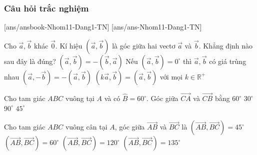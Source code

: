 \subsubsection{Câu hỏi trắc nghiệm}
[ans/ansbook-Nhom11-Dang1-TN]
[ans/ans-Nhom11-Dang1-TN]
\begin{ex}
	Cho $\overrightarrow{a},\overrightarrow{b}$ khác $\overrightarrow{0}$. Kí hiệu $\left (\overrightarrow{a},\overrightarrow{b}\right )$ là góc giữa hai vectơ $\overrightarrow{a}$ và $\overrightarrow{b}$. Khẳng định nào sau đây là đúng?
	\choice
	{$\left (\overrightarrow{a},\overrightarrow{b}\right )=-\left (\overrightarrow{b},\overrightarrow{a}\right )$}
	{Nếu $\left (\overrightarrow{a},\overrightarrow{b}\right )=0^\circ$ thì $\overrightarrow{a},\overrightarrow{b}$ có giá trùng nhau}
	{$\left (\overrightarrow{a},-\overrightarrow{b}\right )=-\left (\overrightarrow{a},\overrightarrow{b}\right )$}
	{\True $\left (k\overrightarrow{a},\overrightarrow{b}\right )=\left (\overrightarrow{a},\overrightarrow{b}\right )$ với mọi $k\in\mathbb{R}^+$}
\end{ex}
\begin{ex}
	Cho tam giác $ABC$ vuông tại $A$ và có $\widehat{B}=60^\circ$. Góc giữa $\overrightarrow{CA}$ và $\overrightarrow{CB}$ bằng
	\choice
	{$60^\circ$}
	{\True $30^\circ$}
	{$90^\circ$}
	{$45^\circ$}
\end{ex}
\begin{ex}%
	Cho tam giác $ABC$ vuông cân tại $A$, góc giữa $\overrightarrow{AB}$ và $\overrightarrow{BC}$ là
	\choice
	{$\left( \overrightarrow{AB}, \overrightarrow{BC}\right)=45^{\circ} $}
	{$\left( \overrightarrow{AB}, \overrightarrow{BC}\right)=60^{\circ} $}
	{$\left( \overrightarrow{AB}, \overrightarrow{BC}\right)=120^{\circ} $}
	{\True $\left( \overrightarrow{AB}, \overrightarrow{BC}\right)=135^{\circ} $}
\end{ex}

